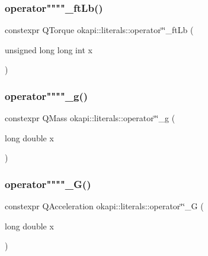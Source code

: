 \mbox{\label{namespaceokapi_1_1literals_a0bb5a987b1cc3e5f511cc5db14d29f8d}} 
\subsubsection{\texorpdfstring{operator""""\_ftLb()}{operator""\_ftLb()}\hspace{0.1cm}{\footnotesize\ttfamily [2/2]}}
{\footnotesize\ttfamily constexpr Q\+Torque okapi\+::literals\+::operator\char`\"{}\char`\"{}\+\_\+ft\+Lb (\begin{DoxyParamCaption}\item[{unsigned long long int}]{x }\end{DoxyParamCaption})}

\mbox{\label{namespaceokapi_1_1literals_a804d615fdde9f059303992644b09e6f1}} 
\subsubsection{\texorpdfstring{operator""""\_g()}{operator""\_g()}\hspace{0.1cm}{\footnotesize\ttfamily [1/2]}}
{\footnotesize\ttfamily constexpr Q\+Mass okapi\+::literals\+::operator\char`\"{}\char`\"{}\+\_\+g (\begin{DoxyParamCaption}\item[{long double}]{x }\end{DoxyParamCaption})}

\mbox{\label{namespaceokapi_1_1literals_a5cc15340933c02ba4a590ac7cc8f2aec}} 
\subsubsection{\texorpdfstring{operator""""\_G()}{operator""\_G()}\hspace{0.1cm}{\footnotesize\ttfamily [1/2]}}
{\footnotesize\ttfamily constexpr Q\+Acceleration okapi\+::literals\+::operator\char`\"{}\char`\"{}\+\_\+G (\begin{DoxyParamCaption}\item[{long double}]{x }\end{DoxyParamCaption})}

